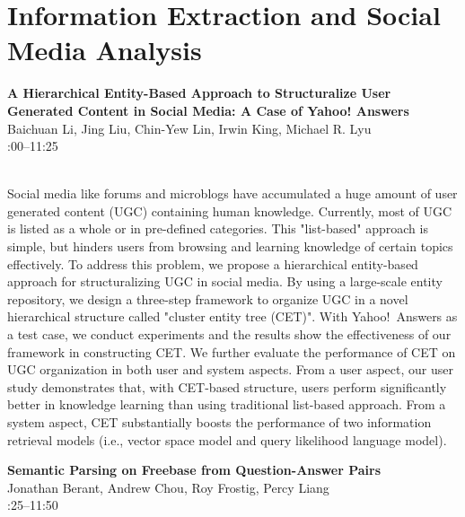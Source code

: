 \documentclass[twoside,makeidx]{book}
\renewcommand{\normalsize}{\fontsize{8}{9}\selectfont}
\renewcommand{\small}{\fontsize{7}{8}\selectfont}
\begin{document}
\section{Information Extraction and Social Media Analysis}
\vspace{-1em}
\par\vspace{2em}\noindent%
\begin{minipage}{\linewidth}%
\begin{center}
\textbf{\normalsize A Hierarchical Entity-Based Approach to Structuralize User Generated Content in Social Media: A Case of Yahoo! Answers}\\
\normalsize  Baichuan Li,  Jing Liu,  Chin-Yew Lin,  Irwin King,  Michael R. Lyu\\
{\small 11:00--11:25}\\
\end{center}
\end{minipage}\\[0.5em]
\nopagebreak%
\noindent%
{\small Social media like forums and microblogs have accumulated a huge amount of user generated content (UGC) containing human knowledge. Currently, most of UGC is listed as a whole or in pre-defined categories. This "list-based" approach is simple, but hinders users  from browsing and learning knowledge of certain topics effectively. To address this problem, we propose a hierarchical entity-based approach for structuralizing UGC in social media. By using a large-scale entity repository, we design a three-step framework to organize  UGC in a novel hierarchical structure called "cluster entity tree (CET)". With Yahoo!~Answers as a test case, we conduct experiments and the results show the effectiveness of our framework in constructing CET. We further evaluate the performance of CET on UGC organization in both user and system aspects. From a user aspect, our user study demonstrates that, with CET-based structure, users perform significantly better in knowledge learning than using traditional list-based approach. From a system aspect, CET substantially boosts the performance of two information retrieval models (i.e., vector space model and query likelihood language model).}
\par\vspace{2em}\noindent%
\begin{minipage}{\linewidth}%
\begin{center}
\textbf{\normalsize Semantic Parsing on Freebase from Question-Answer Pairs}\\
\normalsize  Jonathan Berant,  Andrew Chou,  Roy Frostig,  Percy Liang\\
{\small 11:25--11:50}\\
\end{center}
\end{minipage}\\[0.5em]
\end{document}
